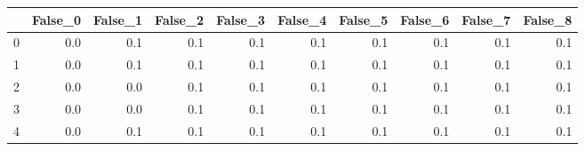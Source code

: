 \begin{tabular}{lrrrrrrrrr}
\toprule
{} &  False\_0 &  False\_1 &  False\_2 &  False\_3 &  False\_4 &  False\_5 &  False\_6 &  False\_7 &  False\_8 \\ \hline
\midrule
0 &      0.0 &      0.1 &      0.1 &      0.1 &      0.1 &      0.1 &      0.1 &      0.1 &      0.1 \\ \hline
1 &      0.0 &      0.1 &      0.1 &      0.1 &      0.1 &      0.1 &      0.1 &      0.1 &      0.1 \\ \hline
2 &      0.0 &      0.0 &      0.1 &      0.1 &      0.1 &      0.1 &      0.1 &      0.1 &      0.1 \\ \hline
3 &      0.0 &      0.0 &      0.1 &      0.1 &      0.1 &      0.1 &      0.1 &      0.1 &      0.1 \\ \hline
4 &      0.0 &      0.1 &      0.1 &      0.1 &      0.1 &      0.1 &      0.1 &      0.1 &      0.1 \\ \hline
\bottomrule
\end{tabular}
